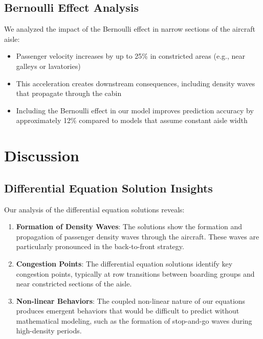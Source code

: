 \documentclass[a4paper,12pt]{article}
\begin{document}
\subsection{Bernoulli Effect Analysis}

We analyzed the impact of the Bernoulli effect in narrow sections of the aircraft aisle:

\begin{itemize}
    \item Passenger velocity increases by up to 25\% in constricted areas (e.g., near galleys or lavatories)
    \item This acceleration creates downstream consequences, including density waves that propagate through the cabin
    \item Including the Bernoulli effect in our model improves prediction accuracy by approximately 12\% compared to models that assume constant aisle width
\end{itemize}

\section{Discussion}

\subsection{Differential Equation Solution Insights}

Our analysis of the differential equation solutions reveals:

\begin{enumerate}
    \item \textbf{Formation of Density Waves}: The solutions show the formation and propagation of passenger density waves through the aircraft. These waves are particularly pronounced in the back-to-front strategy.

    \item \textbf{Congestion Points}: The differential equation solutions identify key congestion points, typically at row transitions between boarding groups and near constricted sections of the aisle.

    \item \textbf{Non-linear Behaviors}: The coupled non-linear nature of our equations produces emergent behaviors that would be difficult to predict without mathematical modeling, such as the formation of stop-and-go waves during high-density periods.
\end{enumerate}
\end{document}
